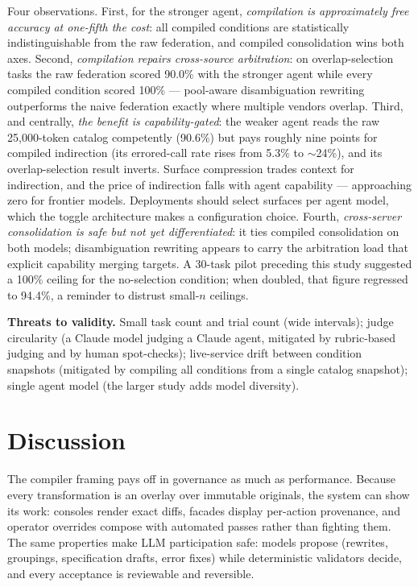 \documentclass[11pt]{article}
\begin{document}
Four observations. First, for the stronger agent, \emph{compilation is
approximately free accuracy at one-fifth the cost}: all compiled conditions
are statistically indistinguishable from the raw federation, and compiled
consolidation wins both axes. Second, \emph{compilation repairs cross-source
arbitration}: on overlap-selection tasks the raw federation scored 90.0\%
with the stronger agent while every compiled condition scored 100\% ---
pool-aware disambiguation rewriting outperforms the naive federation exactly
where multiple vendors overlap. Third, and centrally, \emph{the benefit is
capability-gated}: the weaker agent reads the raw 25{,}000-token catalog
competently (90.6\%) but pays roughly nine points for compiled indirection
(its errored-call rate rises from 5.3\% to $\sim$24\%), and its
overlap-selection result inverts. Surface compression trades context for
indirection, and the price of indirection falls with agent capability ---
approaching zero for frontier models. Deployments should select surfaces per
agent model, which the toggle architecture makes a configuration choice.
Fourth, \emph{cross-server consolidation is safe but not yet differentiated}:
it ties compiled consolidation on both models; disambiguation rewriting
appears to carry the arbitration load that explicit capability merging
targets. A 30-task pilot preceding this study suggested a 100\% ceiling
for the no-selection condition; when doubled, that figure regressed
to 94.4\%, a reminder to distrust small-$n$ ceilings.

\textbf{Threats to validity.} Small task count and trial count (wide
intervals); judge circularity (a Claude model judging a Claude agent,
mitigated by rubric-based judging and by human
spot-checks); live-service drift between condition snapshots (mitigated by
compiling all conditions from a single catalog snapshot); single agent model
(the larger study adds model diversity).

\section{Discussion}

The compiler framing pays off in governance as much as performance. Because
every transformation is an overlay over immutable originals, the system can
show its work: consoles render exact diffs, facades display per-action
provenance, and operator overrides compose with automated passes rather than
fighting them. The same properties make LLM participation safe: models
propose (rewrites, groupings, specification drafts, error fixes) while
deterministic validators decide, and every acceptance is reviewable and
reversible.
\end{document}
